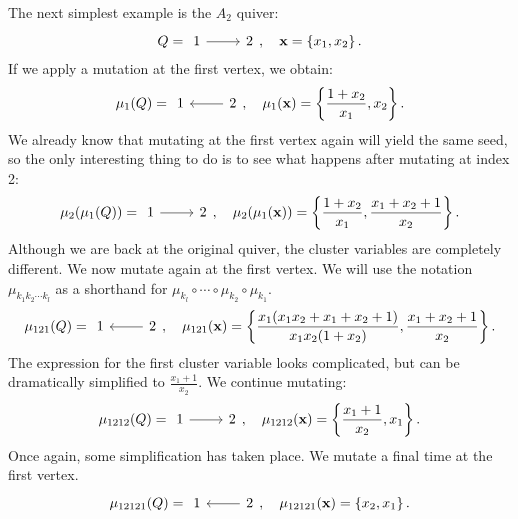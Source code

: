 \documentclass{article}
\newcommand{\bx}{\mathbf{x}}
\begin{document}
\begin{example}
	The next simplest example is the $A_2$ quiver:
	\begin{equation*}
		Q = \begin{tikzcd}
			1 \rar &2
		\end{tikzcd},
		\quad \bx = \left\{x_1, x_2\right\}.
	\end{equation*}
	If we apply a mutation at the first vertex, we obtain:
	\begin{equation*}
		\mu_1(Q) = \begin{tikzcd}
			1 & \lar 2
		\end{tikzcd},
		\quad \mu_1(\bx) = \left\{\frac{1+x_2}{x_1}, x_2\right\}.
	\end{equation*}
	We already know that mutating at the first vertex again will yield the same seed, so
	the only interesting thing to do is to see what happens after mutating at index 2:
	\begin{equation*}
		\mu_2(\mu_1(Q)) = \begin{tikzcd}
			1 \rar & 2
		\end{tikzcd},
		\quad  \mu_2(\mu_1(\bx)) = \left\{\frac{1+x_2}{x_1}, \frac{x_1 + x_2 + 1}{x_2}\right\}.
	\end{equation*}
	Although we are back at the original quiver, the cluster variables are completely
	different. We now mutate again at the first vertex. We will use the notation
	$\mu_{k_1k_2\cdots k_l}$ as a shorthand for $\mu_{k_l} \circ \cdots \circ \mu_{k_2}
		\circ \mu_{k_1}$.
	\begin{equation*}
		\mu_{121}(Q) = \begin{tikzcd}
			1 &\lar 2
		\end{tikzcd},
		\quad  \mu_{121}(\bx) = \left\{\frac{x_1(x_1 x_2 + x_1 + x_2 + 1)}{x_1x_2(1+x_2)}, \frac{x_1 + x_2 + 1}{x_2}\right\}.
	\end{equation*}
	The expression for the first cluster variable looks complicated, but can be
	dramatically simplified to $\frac{x_1 + 1}{x_2}$. We continue mutating:
	\begin{equation*}
		\mu_{1212}(Q) = \begin{tikzcd}
			1 \rar& 2
		\end{tikzcd},
		\quad  \mu_{1212}(\bx) = \left\{\frac{x_1 + 1}{x_2}, x_1\right\}.
	\end{equation*}
	Once again, some simplification has taken place. We mutate a final time at the first
	vertex.
	\begin{equation*}
		\mu_{12121}(Q) = \begin{tikzcd}
			1 &\lar 2
		\end{tikzcd},
		\quad  \mu_{12121}(\bx) = \left\{x_2, x_1\right\}.
	\end{equation*}


\end{example}
\end{document}
